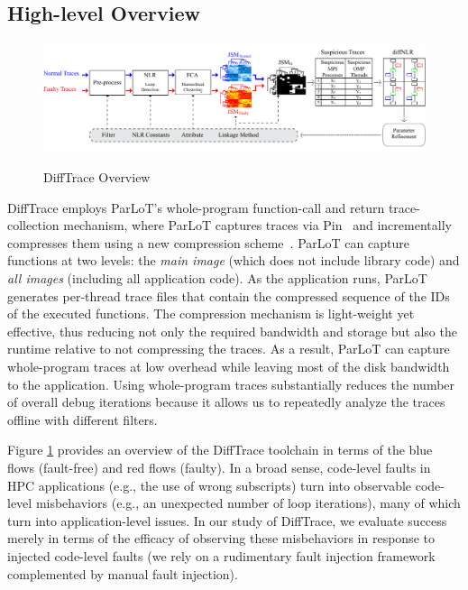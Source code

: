 \subsection{High-level Overview}

\begin{figure}[]
\caption{DiffTrace Overview}
\includegraphics[width=1\textwidth]{figs/overview4.pdf}
\label{fig.diffTraceOverview}
\end{figure}

DiffTrace employs ParLoT's whole-program function-call and return trace-collection mechanism, where ParLoT captures traces via Pin~\cite{pin} and incrementally compresses them using a new compression scheme~\cite{parlot}.
%
ParLoT can capture functions at two levels:
the \textit{main image} (which does not include library code)
and \textit{all images} (including all application code).
%
As the application runs,
ParLoT generates per-thread trace files that
contain the compressed sequence of the IDs of the executed functions.
%
The compression mechanism is light-weight yet effective,
thus reducing not only the required bandwidth and storage but also the
runtime relative to not compressing the traces.
As a result, ParLoT can capture whole-program traces at low overhead
while leaving most of the disk bandwidth to the application. 
%
Using whole-program traces substantially reduces the number of overall
debug iterations because it allows us to repeatedly analyze the
traces offline with different filters.


Figure \ref{fig.diffTraceOverview} provides an overview
of the DiffTrace toolchain
in terms of the blue flows (fault-free) and red flows
(faulty).
%
In a broad sense,
code-level faults in HPC applications (e.g.,
the use of wrong subscripts) turn into observable code-level
misbehaviors
(e.g., an unexpected number of loop iterations), many of which
turn into application-level issues.
%
In our study of DiffTrace, we evaluate
success merely in terms of the efficacy of observing
these misbehaviors in response to injected code-level
faults (we rely on a rudimentary fault injection framework
complemented by manual fault injection).

